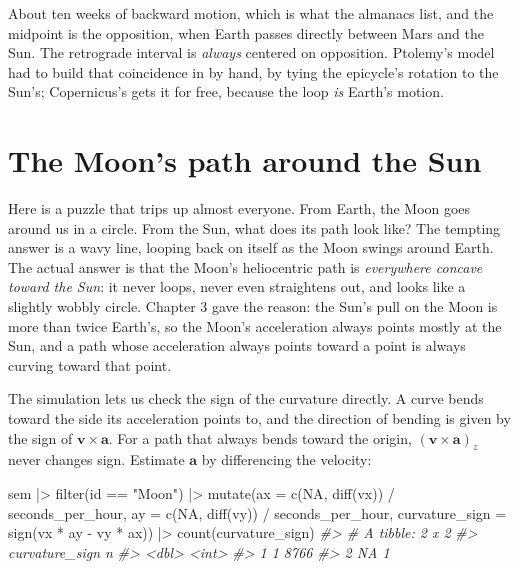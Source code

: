 \documentclass[
  10.5pt,
  letterpaper,
]{scrbook}
\newenvironment{Shaded}{\begin{snugshade}}{\end{snugshade}}
\newcommand{\AttributeTok}[1]{\textcolor[rgb]{0.00,0.00,0.00}{#1}}
\newcommand{\CommentTok}[1]{\textcolor[rgb]{0.00,0.00,0.00}{\textit{#1}}}
\newcommand{\ConstantTok}[1]{\textcolor[rgb]{0.00,0.00,0.00}{#1}}
\newcommand{\FunctionTok}[1]{\textcolor[rgb]{0.00,0.00,0.00}{#1}}
\newcommand{\NormalTok}[1]{\textcolor[rgb]{0.00,0.00,0.00}{#1}}
\newcommand{\SpecialCharTok}[1]{\textcolor[rgb]{0.00,0.00,0.00}{#1}}
\newcommand{\StringTok}[1]{\textcolor[rgb]{0.00,0.00,0.00}{#1}}
\theoremstyle{plain}
\theoremstyle{remark}
\begin{document}
About ten weeks of backward motion, which is what the almanacs list, and
the midpoint is the opposition, when Earth passes directly between Mars
and the Sun. The retrograde interval is \emph{always} centered on
opposition. Ptolemy's model had to build that coincidence in by hand, by
tying the epicycle's rotation to the Sun's; Copernicus's gets it for
free, because the loop \emph{is} Earth's motion.

\section{The Moon's path around the
Sun}\label{the-moons-path-around-the-sun}

Here is a puzzle that trips up almost everyone. From Earth, the Moon
goes around us in a circle. From the Sun, what does its path look like?
The tempting answer is a wavy line, looping back on itself as the Moon
swings around Earth. The actual answer is that the Moon's heliocentric
path is \emph{everywhere concave toward the Sun}: it never loops, never
even straightens out, and looks like a slightly wobbly circle. Chapter 3
gave the reason: the Sun's pull on the Moon is more than twice Earth's,
so the Moon's acceleration always points mostly at the Sun, and a path
whose acceleration always points toward a point is always curving toward
that point.

The simulation lets us check the sign of the curvature directly. A curve
bends toward the side its acceleration points to, and the direction of
bending is given by the sign of \(\mathbf{v}\times\mathbf{a}\). For a
path that always bends toward the origin,
\((\mathbf{v}\times\mathbf{a})_z\) never changes sign. Estimate
\(\mathbf{a}\) by differencing the velocity:

\begin{Shaded}
\begin{Highlighting}[]
\NormalTok{sem }\SpecialCharTok{|\textgreater{}}
  \FunctionTok{filter}\NormalTok{(id }\SpecialCharTok{==} \StringTok{"Moon"}\NormalTok{) }\SpecialCharTok{|\textgreater{}}
  \FunctionTok{mutate}\NormalTok{(}\AttributeTok{ax =} \FunctionTok{c}\NormalTok{(}\ConstantTok{NA}\NormalTok{, }\FunctionTok{diff}\NormalTok{(vx)) }\SpecialCharTok{/}\NormalTok{ seconds\_per\_hour,}
         \AttributeTok{ay =} \FunctionTok{c}\NormalTok{(}\ConstantTok{NA}\NormalTok{, }\FunctionTok{diff}\NormalTok{(vy)) }\SpecialCharTok{/}\NormalTok{ seconds\_per\_hour,}
         \AttributeTok{curvature\_sign =} \FunctionTok{sign}\NormalTok{(vx }\SpecialCharTok{*}\NormalTok{ ay }\SpecialCharTok{{-}}\NormalTok{ vy }\SpecialCharTok{*}\NormalTok{ ax)) }\SpecialCharTok{|\textgreater{}}
  \FunctionTok{count}\NormalTok{(curvature\_sign)}
\CommentTok{\#\textgreater{} \# A tibble: 2 x 2}
\CommentTok{\#\textgreater{}   curvature\_sign     n}
\CommentTok{\#\textgreater{}            \textless{}dbl\textgreater{} \textless{}int\textgreater{}}
\CommentTok{\#\textgreater{} 1              1  8766}
\CommentTok{\#\textgreater{} 2             NA     1}
\end{Highlighting}
\end{Shaded}
\end{document}

